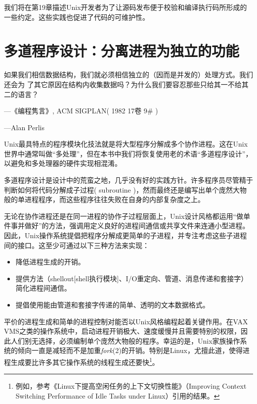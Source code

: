 \documentclass[12pt,oneside]{book}
\begin{document}
\begin{common-format}
我们将在第19章描述Unix开发者为了让源码发布便于校验和编译执行码所形成的一些约定。这些实践也促进了代码的可维护性。


\chapter{多道程序设计：分离进程为独立的功能}
\begin{flushright}
\begin{notecard}{30em}
如果我们相信数据结构，我们就必须相信独立的（因而是并发的）处理方式。我们还会为
了其它原因在结构内收集数据吗？为什么我们要容忍那些只给其一不给其二的语言？

{\hfill —《编程隽言》, ACM SIGPLAN( 1982 17卷 9\#{} )}

{\hfill —Alan Perlis}
\end{notecard}
\end{flushright}

Unix最具特点的程序模块化技法就是将大型程序分解成多个协作进程。这在Unix世界中通常叫做“多处理”，但在本书中我们将恢复使用老的术语“多道程序设计”，以避免和多处理器的硬件实现相混淆。

多道程序设计是设计中的荒蛮之地，几乎没有好的实践方针。许多程序员尽管精于判断如何将代码分解成子过程( subroutine )，然而最终还是编写出单个庞然大物般的单进程程序，而这些程序往往失败在自身的内部复杂度之上。

无论在协作进程还是在同一进程的协作子过程层面上，Unix设计风格都运用“做单件事并做好”的方法，强调用定义良好的进程间通信或共享文件来连通小型进程。因此，Unix操作系统提倡把程序分解成更简单的子进程，并专注考虑这些子进程间的接口。这至少可通过以下三种方法来实现：
\begin{itemize}
\item 降低进程生成的开销。
\item 提供方法（shellout[shell执行模块]、I/O重定向、管道、消息传递和套接字）简化进程间通信。
\item 提倡使用能由管道和套接字传递的简单、透明的文本数据格式。
\end{itemize}

平价的进程生成和简单的进程控制对能否以Unix风格编程起着关键作用。在VAX VMS之类的操作系统中，启动进程开销极大、速度缓慢并且需要特别的权限，因此人们别无选择，必须编制单个庞然大物般的程序。幸运的是，Unix家族操作系统的倾向一直是减轻而不是加重\textit{fork}(2)的开销。特别是Linux，尤擅此道，使得进程生成要比许多其它操作系统的线程生成还要快\footnote{例如，参考《Linux下提高空闲任务的上下文切换性能》（Improving Context Switching Performance of Idle Tasks under Linux）\cite{Appleton}引用的结果。}。


\end{common-format}
\end{document}
